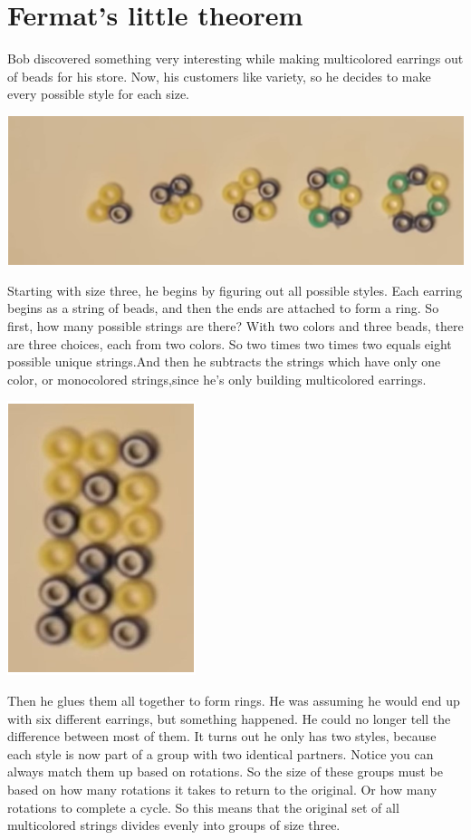 \documentclass{report}
\begin{document}
\section{Fermat's little theorem}
Bob discovered something very interesting while making multicolored earrings out of beads for his store. Now, his customers like variety, so he decides to make every possible style for each size.
 \begin{center}
	\includegraphics[scale=1]{83.png}
\end{center}
 Starting with size three, he begins by figuring out all possible styles. Each earring begins as a string of beads, and then the ends are attached to form a ring. So first, how many possible strings are there? With two colors and three beads, there are three choices, each from two colors. So two times two times two equals eight possible unique strings.And then he subtracts the strings which have only one color, or monocolored strings,since he's only building multicolored earrings.
 \begin{center}
	\includegraphics[scale=1]{84.png}
\end{center}
 
Then he glues them all together to form rings. He was assuming he would end up with six different earrings, but something happened. He could no longer tell the difference between most of them. It turns out he only has two styles, because each style is now part of a group with two identical partners. Notice you can always match them up based on rotations. So the size of these groups must be based on how many rotations it takes to return to the original. Or how many rotations to complete a cycle. So this means that the original set of all multicolored strings divides evenly into groups of size three.
\end{document}
